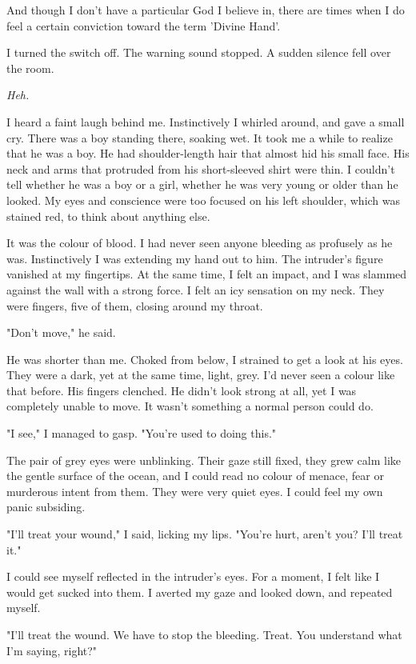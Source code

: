 And though I don't have a particular God I believe in, there are times
when I do feel a certain conviction toward the term 'Divine Hand'.

I turned the switch off. The warning sound stopped. A sudden silence
fell over the room.

\emph{Heh.}

I heard a faint laugh behind me. Instinctively I whirled around, and
gave a small cry. There was a boy standing there, soaking wet. It took
me a while to realize that he was a boy. He had shoulder-length hair
that almost hid his small face. His neck and arms that protruded from
his short-sleeved shirt were thin. I couldn't tell whether he was a boy
or a girl, whether he was very young or older than he looked. My eyes
and conscience were too focused on his left shoulder, which was stained
red, to think about anything else.

It was the colour of blood. I had never seen anyone bleeding as
profusely as he was. Instinctively I was extending my hand out to him.
The intruder's figure vanished at my fingertips. At the same time, I
felt an impact, and I was slammed against the wall with a strong force.
I felt an icy sensation on my neck. They were fingers, five of them,
closing around my throat.

\mybreak

"Don't move," he said.

He was shorter than me. Choked from below, I strained to get a look at
his eyes. They were a dark, yet at the same time, light, grey. I'd never
seen a colour like that before. His fingers clenched. He didn't look
strong at all, yet I was completely unable to move. It wasn't something
a normal person could do.

"I see," I managed to gasp. "You're used to doing this."

\myspace

The pair of grey eyes were unblinking. Their gaze still fixed, they grew
calm like the gentle surface of the ocean, and I could read no colour of
menace, fear or murderous intent from them. They were very quiet eyes. I
could feel my own panic subsiding.

"I'll treat your wound," I said, licking my lips. "You're hurt, aren't
you? I'll treat it."

I could see myself reflected in the intruder's eyes. For a moment, I
felt like I would get sucked into them. I averted my gaze and looked
down, and repeated myself.

"I'll treat the wound. We have to stop the bleeding. Treat. You
understand what I'm saying, right?"

